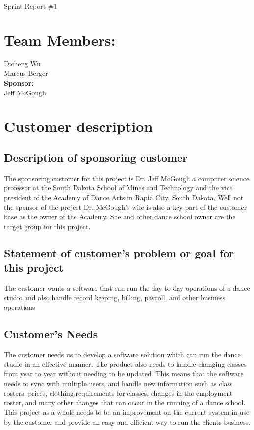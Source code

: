 \documentclass[11pt]{book}
\begin{document}
\fontsize{5}{5}\selectfont Sprint Report \#1


\section{Team Members:}
Dicheng Wu
\\Marcus Berger\\
\textbf{Sponsor:}
\\Jeff McGough
\\

\section{Customer description}

\subsection{Description of sponsoring customer}
The sponsoring customer for this project is Dr. Jeff McGough a computer science professor at the South Dakota School of Mines and Technology and the vice president of the Academy of Dance Arts in Rapid City, South Dakota. Well not the sponsor of the project Dr. McGough's wife is also a key part of the customer base as the owner of the Academy. She and other dance school owner are the target group for this project. 

\subsection{Statement of customer's problem or goal for this project}
The customer wants a software that can run the day to day operations of a dance studio and also handle record keeping, billing, payroll, and other business operations
 
\subsection{Customer's Needs}
The customer needs us to develop a software solution which can run the dance studio in an effective manner. The product also needs to handle changing classes from year to year without needing to be updated. This means that the software needs to sync with multiple users, and handle new information such as class rosters, prices, clothing requirements for classes, changes in the employment roster, and many other changes that can occur in the running of a dance school.\\
This project as a whole needs to be an improvement on the current system in use by the customer and provide an easy and efficient way to run the clients business. 
\end{document}
